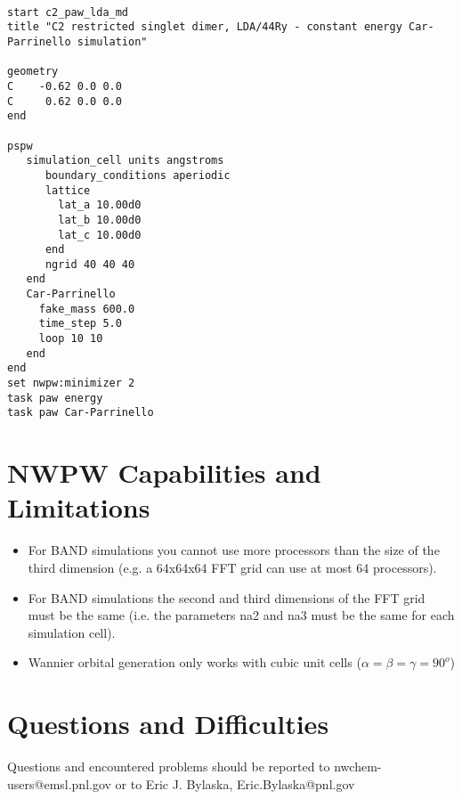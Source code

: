 \begin{verbatim}
         
start c2_paw_lda_md
title "C2 restricted singlet dimer, LDA/44Ry - constant energy Car-Parrinello simulation"

geometry  
C    -0.62 0.0 0.0
C     0.62 0.0 0.0
end
       
pspw
   simulation_cell units angstroms
      boundary_conditions aperiodic
      lattice
        lat_a 10.00d0
        lat_b 10.00d0
        lat_c 10.00d0
      end
      ngrid 40 40 40
   end
   Car-Parrinello
     fake_mass 600.0
     time_step 5.0
     loop 10 10
   end
end
set nwpw:minimizer 2
task paw energy
task paw Car-Parrinello
\end{verbatim}



\section{NWPW Capabilities and Limitations}
\label{sec:pspw_limits}
\normalsize

\begin{itemize}
\item For BAND simulations you cannot use more processors than the size of the third dimension 
  (e.g. a 64x64x64 FFT grid can use at most 64 processors).
\item For BAND simulations the second and third dimensions of the FFT grid must be the same 
  (i.e. the parameters na2 and na3 must be the same for each simulation cell).
\item Wannier orbital generation only works with cubic unit cells ($\alpha=\beta=\gamma=90^o$)
\end{itemize}


\section{Questions and Difficulties}
\normalsize

Questions and encountered problems should be reported to 
nwchem-users@emsl.pnl.gov 
or to Eric J. Bylaska, Eric.Bylaska@pnl.gov






